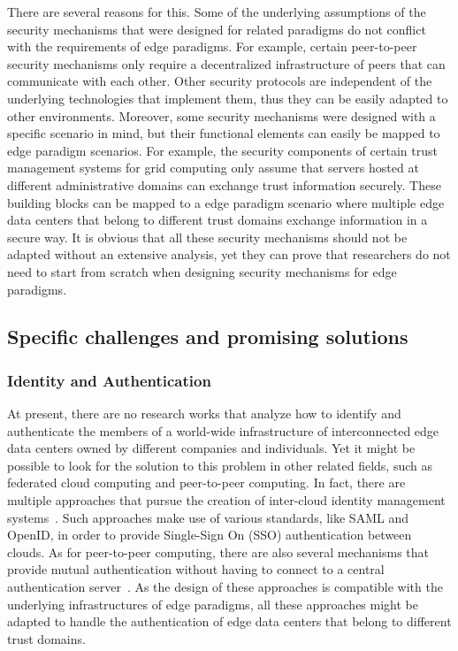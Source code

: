\documentclass[twocolumn,preprint,3p]{elsarticle}
\begin{document}
There are several reasons for this. Some of the underlying assumptions of the security mechanisms that were designed for related paradigms do not conflict with the requirements of edge paradigms. For example, certain peer-to-peer security mechanisms only require a decentralized infrastructure of peers that can communicate with each other. Other security protocols are independent of the underlying technologies that implement them, thus they can be easily adapted to other environments. Moreover, some security mechanisms were designed with a specific scenario in mind, but their functional elements can easily be mapped to edge paradigm scenarios. For example, the security components of certain trust management systems for grid computing only assume that servers hosted at different administrative domains can exchange trust information securely. These building blocks can be mapped to a edge paradigm scenario where multiple edge data centers that belong to different trust domains exchange information in a secure way. It is obvious that all these security mechanisms should not be adapted without an extensive analysis, yet they can prove that researchers do not need to start from scratch when designing security mechanisms for edge paradigms.

\subsection{Specific challenges and promising solutions}
\label{sec_cha::cha}

\subsubsection{Identity and Authentication}

At present, there are no research works that analyze how to identify and authenticate the members of a world-wide infrastructure of interconnected edge data centers owned by different companies and individuals. Yet it might be possible to look for the solution to this problem in other related fields, such as federated cloud computing and peer-to-peer computing. In fact, there are multiple approaches that pursue the creation of inter-cloud identity management systems~\cite{Toosi14}. Such approaches make use of various standards, like SAML and OpenID, in order to provide Single-Sign On (SSO) authentication between clouds. As for peer-to-peer computing, there are also several mechanisms that provide mutual authentication without having to connect to a central authentication server~\cite{Touceda15}. As the design of these approaches is compatible with the underlying infrastructures of edge paradigms, all these approaches might be adapted to handle the authentication of edge data centers that belong to different trust domains.
\end{document}
